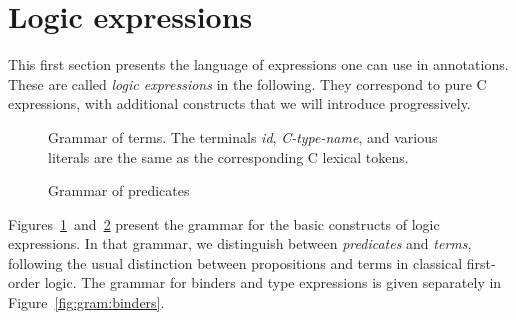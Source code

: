 
\section{Logic expressions}
\label{sec:expressions}

This first section presents the language of expressions one can use in
annotations. These are called \emph{logic expressions} in the following. They
correspond to pure C expressions, with additional constructs
that we will introduce progressively.

\begin{figure}[t]
  \begin{cadre}
    
  \end{cadre}
  \caption{Grammar of terms. The terminals \emph{id}, \emph{C-type-name}, and various literals are
  	the same as the corresponding C lexical tokens.}
\label{fig:gram:term}
\end{figure}\textsl{}

\begin{figure}[hb]
  \begin{cadre}
    
  \end{cadre}
  \caption{Grammar of predicates}
\label{fig:gram:pred}
\end{figure}

Figures~\ref{fig:gram:term}~and~\ref{fig:gram:pred} present the
grammar for the basic constructs of logic expressions. In that
grammar, we distinguish between \emph{predicates} and
\emph{terms}, following the usual distinction between
propositions and terms in classical first-order logic. The grammar
for binders and type expressions is given separately in
Figure~\ref{fig:gram:binders}.

